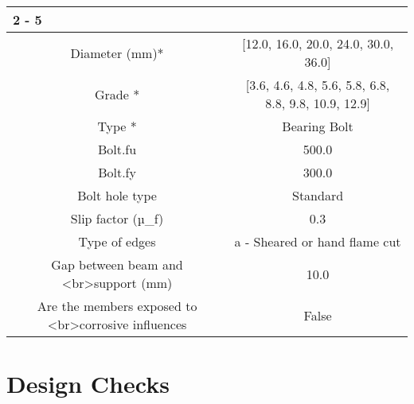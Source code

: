 \documentclass{article}%
\begin{document}
\begin{longtable}{|p{5cm}|p{2cm}|p{2cm}|p{2cm}|p{5cm}|}
\cline{2%
-%
5}%
\hline%
\multicolumn{5}{|c|}{\textbf{Bolt Details}}\\%
\hline%
\hline%
\multicolumn{3}{|c|}{Diameter (mm)*}&\multicolumn{2}{|c|}{{[}12.0, 16.0, 20.0, 24.0, 30.0, 36.0{]}}\\%
\hline%
\hline%
\multicolumn{3}{|c|}{Grade *}&\multicolumn{2}{|c|}{{[}3.6, 4.6, 4.8, 5.6, 5.8, 6.8, 8.8, 9.8, 10.9, 12.9{]}}\\%
\hline%
\hline%
\multicolumn{3}{|c|}{Type *}&\multicolumn{2}{|c|}{Bearing Bolt}\\%
\hline%
\hline%
\multicolumn{3}{|c|}{Bolt.fu}&\multicolumn{2}{|c|}{500.0}\\%
\hline%
\hline%
\multicolumn{3}{|c|}{Bolt.fy}&\multicolumn{2}{|c|}{300.0}\\%
\hline%
\hline%
\multicolumn{3}{|c|}{Bolt hole type}&\multicolumn{2}{|c|}{Standard}\\%
\hline%
\hline%
\multicolumn{3}{|c|}{Slip factor (µ\_f)}&\multicolumn{2}{|c|}{0.3}\\%
\hline%
\hline%
\multicolumn{3}{|c|}{Type of edges}&\multicolumn{2}{|c|}{a {-} Sheared or hand flame cut}\\%
\hline%
\hline%
\multicolumn{3}{|c|}{Gap between beam and <br>support (mm)}&\multicolumn{2}{|c|}{10.0}\\%
\hline%
\hline%
\multicolumn{3}{|c|}{Are the members exposed to <br>corrosive influences}&\multicolumn{2}{|c|}{False}\\%
\hline%
\end{longtable}

%
%
\newpage%
\section{Design Checks}%
\label{sec:DesignChecks}%
\end{document}
